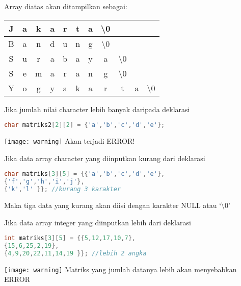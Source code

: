 Array diatas akan ditampilkan sebagai:

\begin{tabular}{|c|c|c|c|c|c|c|c|c|c|c|}
\hline
J & a & k & a & r & t & a & \textbackslash{0} & & & \\ \hline
B & a & n & d & u & n & g & \textbackslash{0} & & & \\ \hline
S & u & r & a & b & a & y & a &\textbackslash{0}  & &\\ \hline
S & e & m & a & r & a & n & g & \textbackslash{0} & & \\ \hline
Y & o & g & y & a & k & a & r & t & a &   \textbackslash{0} \\ \hline

\end{tabular}


Jika jumlah nilai character lebih banyak daripada deklarasi

\begin{lstlisting}[language=c++, numbers=none]
char matriks2[2][2] = {'a','b','c','d','e'};
\end{lstlisting}

\texttt{[image: warning]} Akan terjadi ERROR!

\begin{figure}[htbp]
\centering
{}

\end{figure}

Jika data array character yang diinputkan kurang dari deklarasi

\begin{lstlisting}[language=c++, numbers=none]
char matriks[3][5] = {{'a','b','c','d','e'},
{'f','g','h','i','j'},
{'k','l' }}; //kurang 3 karakter
\end{lstlisting}

Maka tiga data yang kurang akan diisi dengan karakter NULL atau `\textbackslash{}0'

Jika data array integer yang diinputkan lebih dari deklarasi

\begin{lstlisting}[language=c++, numbers=none]
int matriks[3][5] = {{5,12,17,10,7},
{15,6,25,2,19},
{4,9,20,22,11,14,19 }}; //lebih 2 angka
\end{lstlisting}

\texttt{[image: warning]} Matriks yang jumlah datanya lebih akan menyebabkan ERROR


\begin{figure}
\centering
{}
\end{figure}




